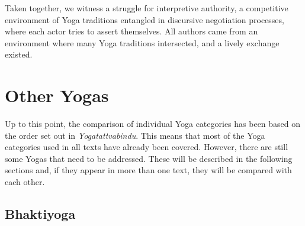 Taken together, we witness a struggle for interpretive authority, a competitive environment of Yoga traditions entangled in discursive negotiation processes, where each actor tries to assert themselves. All authors came from an environment where many Yoga traditions intersected, and a lively exchange existed.
%
\section{Other Yogas}

Up to this point, the comparison of individual Yoga categories has been based on the order set out in \emph{Yogatattvabindu}. This means that most of the Yoga categories used in all texts have already been covered. However, there are still some Yogas that need to be addressed. These will be described in the following sections and, if they appear in more than one text, they will be compared with each other.

\subsection{Bhaktiyoga}
\label{bhaktiyogaintro}

